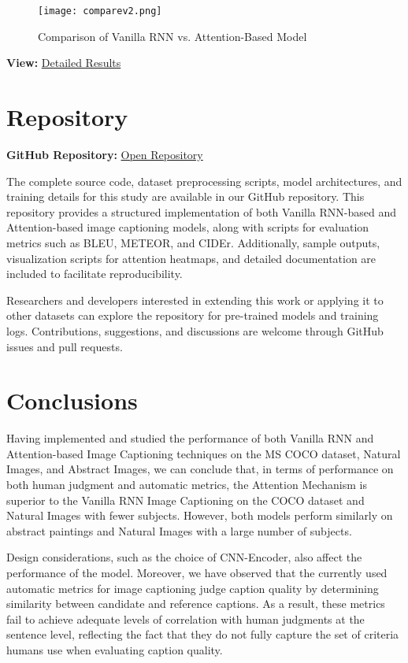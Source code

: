 \documentclass{article}
\begin{document}
\begin{figure}[htbp]
    \centering
    \texttt{[image: comparev2.png]}
    \caption{Comparison of Vanilla RNN vs. Attention-Based Model}
    \label{fig:compare}
\end{figure}

\noindent\textbf{View:} \href{https://github.com/HemanthTejaY/Deep-Learning-Image-Captioning---A-comparitive-study/blob/main/Images/detailed-res.pdf}{Detailed Results}

\section{Repository}

\noindent\textbf{GitHub Repository:} \href{https://github.com/HemanthTejaY/Deep-Learning-Image-Captioning---A-comparative-study}{Open Repository}

The complete source code, dataset preprocessing scripts, model architectures, and training details for this study are available in our GitHub repository. This repository provides a structured implementation of both Vanilla RNN-based and Attention-based image captioning models, along with scripts for evaluation metrics such as BLEU, METEOR, and CIDEr. Additionally, sample outputs, visualization scripts for attention heatmaps, and detailed documentation are included to facilitate reproducibility.

Researchers and developers interested in extending this work or applying it to other datasets can explore the repository for pre-trained models and training logs. Contributions, suggestions, and discussions are welcome through GitHub issues and pull requests.

\section{Conclusions}

Having implemented and studied the performance of both Vanilla RNN and Attention-based Image Captioning techniques on the MS COCO dataset, Natural Images, and Abstract Images, we can conclude that, in terms of performance on both human judgment and automatic metrics, the Attention Mechanism is superior to the Vanilla RNN Image Captioning on the COCO dataset and Natural Images with fewer subjects. However, both models perform similarly on abstract paintings and Natural Images with a large number of subjects.

Design considerations, such as the choice of CNN-Encoder, also affect the performance of the model. Moreover, we have observed that the currently used automatic metrics for image captioning judge caption quality by determining similarity between candidate and reference captions. As a result, these metrics fail to achieve adequate levels of correlation with human judgments at the sentence level, reflecting the fact that they do not fully capture the set of criteria humans use when evaluating caption quality.
\end{document}
